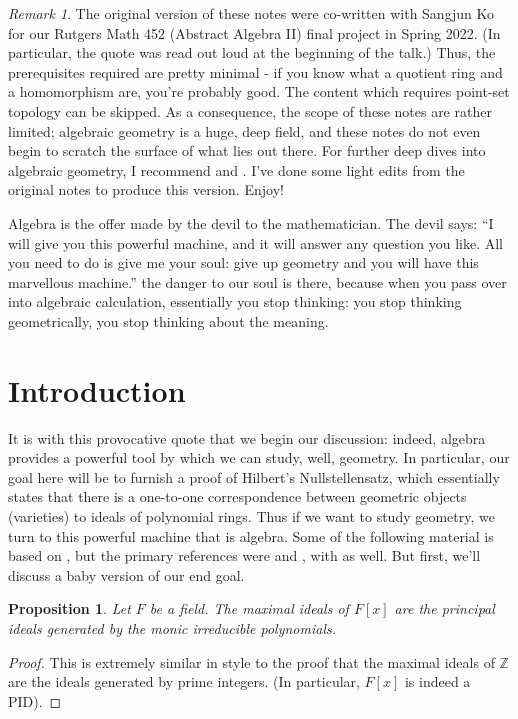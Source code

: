 \documentclass[letterpaper]{article}
\newtheorem{proposition}[theorem]{Proposition}
\theoremstyle{definition}
\theoremstyle{remark}
\newtheorem{remark}[theorem]{Remark}
\newcommand\ZZ{\mathbb{Z}}
\begin{document}
\begin{remark}
	The original version of these notes were co-written with Sangjun Ko for our Rutgers Math 452 (Abstract Algebra II) final project in Spring 2022. (In particular, the quote was read out loud at the beginning of the talk.) Thus, the prerequisites required are pretty minimal - if you know what a quotient ring and a homomorphism are, you're probably good. The content which requires point-set topology can be skipped. As a consequence, the scope of these notes are rather limited; algebraic geometry is a huge, deep field, and these notes do not even begin to scratch the surface of what lies out there. For further deep dives into algebraic geometry, I recommend \cite{gathmann} and \cite{vakil}. I've done some light edits from the original notes to produce this version. Enjoy! 
\end{remark}

\begin{displayquote}
	Algebra is the offer made by the devil to the mathematician. The devil says: ``I will give you this powerful machine, and it will answer any question you like. All you need to do is give me your soul: give up geometry and you will have this marvellous machine.'' \textellipsis the danger to our soul is there, because when you pass over into algebraic calculation, essentially you stop thinking: you stop thinking geometrically, you stop thinking about the meaning.
\end{displayquote}

\section{Introduction}
It is with this provocative quote that we begin our discussion: indeed, algebra provides a powerful tool by which we can study, well, geometry. In particular, our goal here will be to furnish a proof of Hilbert's Nullstellensatz, which essentially states that there is a one-to-one correspondence between geometric objects (varieties) to ideals of polynomial rings. Thus if we want to study geometry, we turn to this powerful machine that is algebra\textellipsis. Some of the following material is based on \cite{artin}, but the primary references were \cite{reid} and \cite{smith}, with \cite{aluffi} as well. But first, we'll discuss a baby version of our end goal. 

\begin{proposition}\label{prop:monicirr}
	Let \(F\) be a field. The maximal ideals of \(F[x]\) are the principal ideals generated by the monic irreducible polynomials. 
\end{proposition}
\begin{proof}
	This is extremely similar in style to the proof that the maximal ideals of \(\ZZ\) are the ideals generated by prime integers. (In particular, $F[x]$ is indeed a PID).
\end{proof}
\end{document}
